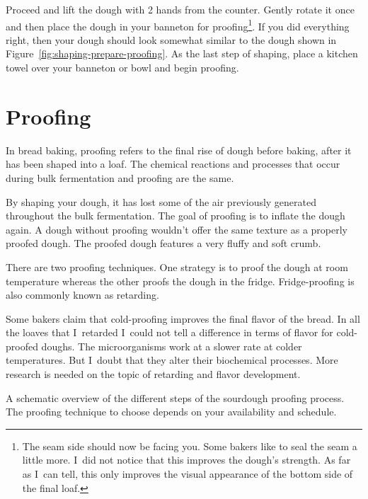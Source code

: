 Proceed and lift the dough with 2 hands from the counter.  Gently rotate it
once and then place the dough in your banneton for proofing\footnote{The seam
    side should now be facing you.  Some bakers like to seal the seam a little
    more. I~did not notice that this improves the dough's strength. As far as
    I~can tell, this only improves the visual appearance of the bottom side of
    the final loaf.}.
If you did everything right, then your dough should look somewhat similar to
the dough shown in Figure~\ref{fig:shaping-prepare-proofing}.  As the last
step of shaping, place a kitchen towel over your banneton or bowl and begin
proofing.

\section{Proofing}

In bread baking, proofing refers to the final rise of dough before baking,
after it has been shaped into a loaf. The chemical reactions and processes
that occur during bulk fermentation and proofing are the same.

By shaping your dough, it has lost some of the air previously generated
throughout the bulk fermentation. The goal of proofing is to inflate
the dough again. A dough without proofing wouldn't offer the same texture
as a properly proofed dough. The proofed dough features a very fluffy
and soft crumb.

There are two proofing techniques. One strategy is to proof the dough
at room temperature whereas the other proofs the dough in the fridge.
Fridge-proofing is also commonly known as retarding.

Some bakers claim that cold-proofing improves the final flavor of the bread.
In all the loaves that I~retarded I~could not tell a difference
in terms of flavor for cold-proofed doughs. The microorganisms work
at a slower rate at colder temperatures. But I~doubt that they alter
their biochemical processes. More research is needed on the topic
of retarding and flavor development.

\begin{flowchart}[!htb]
\centering
  
  \caption[Sourdough proofing process]{A schematic overview of the different steps of
      the sourdough proofing process. The proofing technique to choose depends
      on your availability and schedule.}%
  \label{fig:proofing-process}
\end{flowchart}

